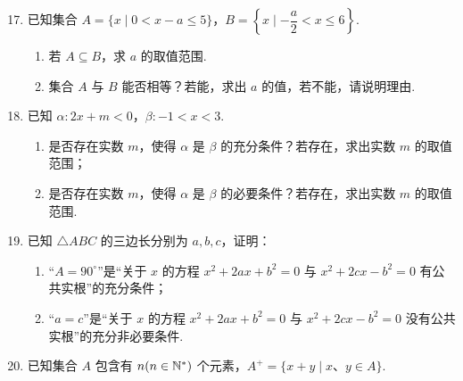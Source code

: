 \documentclass[a4paper,11pt]{article}
\begin{document}
\begin{enumerate}
\setcounter{enumi}{16}

\item 已知集合 $A=\{x\mid 0<x-a\leqslant 5\}$，$B=\left\{x\mid -\dfrac{a}{2}<x\leqslant 6\right\}$.

\begin{enumerate}[label=(\arabic*)]
\item 若 $A\subseteq B$，求 $a$ 的取值范围.
\item 集合 $A$ 与 $B$ 能否相等？若能，求出 $a$ 的值，若不能，请说明理由.
\end{enumerate}


\ifanswer
\solbegin
{}
\solend

\fi

\ansspace[6]

\item 已知 $\alpha:2x+m<0$，$\beta:-1<x<3$.

\begin{enumerate}[label=(\arabic*)]
\item 是否存在实数 $m$，使得 $\alpha$ 是 $\beta$ 的充分条件？若存在，求出实数 $m$ 的取值范围；
\item 是否存在实数 $m$，使得 $\alpha$ 是 $\beta$ 的必要条件？若存在，求出实数 $m$ 的取值范围.
\end{enumerate}


\ansspace[6]

\item 已知 $\triangle ABC$ 的三边长分别为 $a,b,c$，证明：

\begin{enumerate}[label=(\arabic*)]
\item “$A=90^\circ$”是“关于 $x$ 的方程 $x^2+2ax+b^2=0$ 与 $x^2+2cx-b^2=0$ 有公共实根”的充分条件；
\item “$a=c$”是“关于 $x$ 的方程 $x^2+2ax+b^2=0$ 与 $x^2+2cx-b^2=0$ 没有公共实根”的充分非必要条件.
\end{enumerate}


\ansspace[8]

\item 已知集合 $A$ 包含有 $n(n\in\mathbb{N}^*)$ 个元素，$A^+=\{x+y\mid x\text{、}y\in A\}$.


\end{enumerate}
\end{document}
